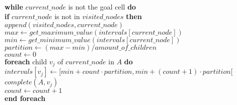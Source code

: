 \begin{algorithm}
\begin{algorithmic}
\\

\textbf{while} $current\_node$ is not the goal cell \textbf{do}\\

\hspace{0.3cm} \textbf{if} $current\_node$ is not in $visited\_nodes$ \textbf{then}\\

\hspace{0.6cm} $append(visited\_nodes, current\_node)$\\


\hspace{0.6cm} $max \gets get\_maximum\_value(intervals[current\_node])$\\


\hspace{0.6cm} $min \gets get\_minimum\_value(intervals[current\_node])$\\

\hspace{0.6cm} $partition \gets (max - min) \slash amount\_of\_children$\\

\hspace{0.6cm} $count \gets 0$\\

\hspace{0.6cm} \textbf{foreach} child $v_{j}$ of $current\_node$ in $A$ \textbf{do}\\

\hspace{0.9cm} $intervals[v_{j}] \gets [min + count \cdot  partition, min + (count+1) \cdot  partition[$\\

\hspace{0.9cm} $complete(A, v_{j})$\\

\hspace{0.9cm} $count \gets count + 1$\\

\hspace{0.6cm} \textbf{end foreach}\\


\end{algorithmic}
\end{algorithm}
